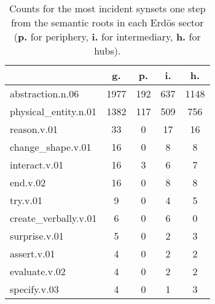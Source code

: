 \begin{table}[h!]
\begin{center}
\begin{tabular}{| l || c | c | c | c |}\hline
 & {\bf g.} & {\bf p.} & {\bf i.} & {\bf h.} \\\hline\hline
abstraction.n.06 & 1977  & 192  & 637  & 1148 \\\hline
physical\_entity.n.01 & 1382  & 117  & 509  & 756 \\\hline
reason.v.01 & 33  & 0  & 17  & 16 \\\hline
change\_shape.v.01 & 16  & 0  & 8  & 8 \\\hline
interact.v.01 & 16  & 3  & 6  & 7 \\\hline
end.v.02 & 16  & 0  & 8  & 8 \\\hline
try.v.01 & 9  & 0  & 4  & 5 \\\hline
create\_verbally.v.01 & 6  & 0  & 6  & 0 \\\hline
surprise.v.01 & 5  & 0  & 2  & 3 \\\hline
assert.v.01 & 4  & 0  & 2  & 2 \\\hline
evaluate.v.02 & 4  & 0  & 2  & 2 \\\hline
specify.v.03 & 4  & 0  & 1  & 3 \\\hline
\end{tabular}
\caption{Counts for the most incident synsets one step from the semantic roots in each Erd\"os sector ({{\bf p.}} for periphery, {{\bf i.}} for intermediary, {{\bf h.}} for hubs).}
\end{center}
\end{table}
